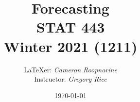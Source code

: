 



\title{
\LARGE Forecasting\\
\large STAT 443\\
\normalsize Winter 2021 (1211)}
\author{\LaTeX{}er: \emph{Cameron Roopnarine}\\Instructor: \emph{Gregory Rice}}
\date{\today}



\maketitle

\tableofcontents















